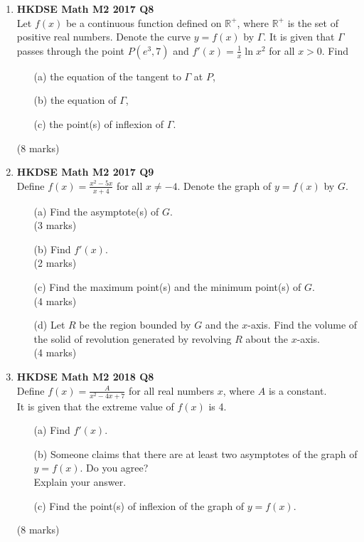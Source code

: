 \documentclass{report}
\begin{document}
\begin{enumerate}
	\item \textbf{HKDSE Math M2 2017 Q8}\\
	Let $f(x) $ be a continuous function defined on  $\mathbb{R} ^+$, where $\mathbb{R} ^+$ is the set of positive real numbers. Denote the curve $y = f(x)$ by  $\Gamma$. It is given that $\Gamma$ passes through the point $P(e^3 , 7)$ and $f'(x) = \displaystyle\frac{1}{x} \ln{x^2}$ for all $x>0$. Find 
	\begin{enumerate}
		\item [(a)] the equation of the tangent to $\Gamma$ at $P$,
		\item [(b)] the equation of $\Gamma$,
		\item [(c)] the point(s) of inflexion of $\Gamma$.
	\end{enumerate}
	(8 marks)

	\item \textbf{HKDSE Math M2 2017 Q9}\\
	Define $f(x) = \displaystyle\frac{x^2 - 5x}{x + 4}$ for all $x \neq -4$. Denote the graph of $y = f(x)$ by $G$. 
	\begin{enumerate}
		\item [(a)]Find the asymptote(s) of $G$.  \\(3 marks)
		\item [(b)]Find $f'(x)$. \\(2 marks) 
		\item [(c)]Find the maximum point(s) and the minimum point(s) of $G$. \\(4 marks) 
		\item [(d)]Let $R$ be the region bounded by $G$ and the $x$-axis. Find the volume of the solid of revolution generated by revolving $R$ about the $x$-axis. \\(4 marks)
	\end{enumerate}

	\item \textbf{HKDSE Math M2 2018 Q8}\\
	Define $f(x) = \displaystyle \frac{A}{x^2-4x+7}$ for all real numbers $x$, where $A$ is a constant. \\
	It is given that the extreme value of $f(x)$ is 4. 
	\begin{enumerate}
		\item [(a)] Find $f'(x)$. 
		\item [(b)] Someone claims that there are at least two asymptotes of the graph of $ y =  f(x)$. Do you agree? \\
		Explain your answer. 
		\item [(c)] Find the point(s) of inflexion of the graph of $y =f(x)$.
	\end{enumerate}
	(8 marks)


\end{enumerate}
\end{document}
